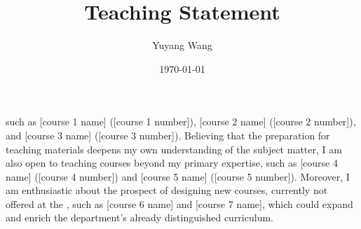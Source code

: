 



\title{Teaching Statement}

\def\courseOneName{[course 1 name]}
\def\courseOneNumber{[course 1 number]}
\def\courseTwoName{[course 2 name]}
\def\courseTwoNumber{[course 2 number]}
\def\courseThreeName{[course 3 name]}
\def\courseThreeNumber{[course 3 number]}
\def\courseFourName{[course 4 name]}
\def\courseFourNumber{[course 4 number]}
\def\courseFiveName{[course 5 name]}
\def\courseFiveNumber{[course 5 number]}
\def\courseSixName{[course 6 name]}
\def\courseSixNumber{[course 6 number]}
\def\courseSevenName{[course 7 name]}
\def\courseSevenNumber{[course 7 number]}

\def\rsCustom{%
such as \courseOneName{} (\courseOneNumber{}), \courseTwoName{} (\courseTwoNumber{}), and \courseThreeName{} (\courseThreeNumber{}). Believing that the preparation for teaching materials deepens my own understanding of the subject matter, I am also open to teaching courses beyond my primary expertise, such as \courseFourName{} (\courseFourNumber{}) and \courseFiveName{} (\courseFiveNumber{}). Moreover, I am enthusiastic about the prospect of designing new courses, currently not offered at the \appSchool{}, such as \courseSixName{} and \courseSevenName{}, which could expand and enrich the department's already distinguished curriculum.
}

\author{Yuyang Wang}
\date{\today}
\makeatletter
\fancyfoot[L]{\scshape \MakeLowercase{\@author}}
\fancyfoot[R]{{\scshape \MakeLowercase{\@title}}\quad{\LARGE\sfrac{\thepage}{\pageref*{LastPage}}}}
\makeatother



\maketitle%
\thispagestyle{fancy}


\rsCustom{}


\footnotesize


